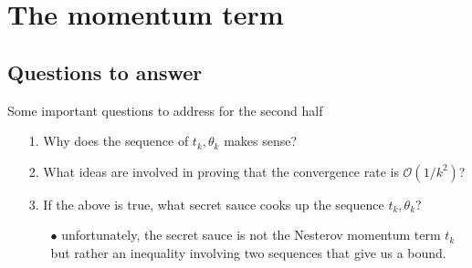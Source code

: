 \documentclass[11pt]{beamer}
\begin{document}
\section{The momentum term}
    \subsection{Questions to answer}
        \begin{frame}{Some important questions to address for the second half}
            \begin{itemize}
                \item [1.] Why does the sequence of $t_k, \theta_k$ makes sense?
                \item [2.] What ideas are involved in proving that the convergence rate is $\mathcal O(1/k^2)$? 
                \item [3.] If the above is true, what secret sauce cooks up the sequence $t_k, \theta_k$?
                \begin{itemize}
                    \item [$\bullet$] unfortunately, the secret sauce is not the Nesterov momentum term $t_k$ but rather an inequality involving two sequences that give us a bound. 
                \end{itemize}
            \end{itemize}
        \end{frame}
\end{document}
